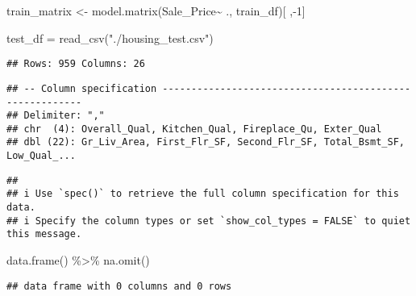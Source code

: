 \documentclass[
]{article}
\newenvironment{Shaded}{\begin{snugshade}}{\end{snugshade}}
\newcommand{\CommentTok}[1]{\textcolor[rgb]{0.56,0.35,0.01}{\textit{#1}}}
\newcommand{\DecValTok}[1]{\textcolor[rgb]{0.00,0.00,0.81}{#1}}
\newcommand{\FunctionTok}[1]{\textcolor[rgb]{0.00,0.00,0.00}{#1}}
\newcommand{\NormalTok}[1]{#1}
\newcommand{\OtherTok}[1]{\textcolor[rgb]{0.56,0.35,0.01}{#1}}
\newcommand{\SpecialCharTok}[1]{\textcolor[rgb]{0.00,0.00,0.00}{#1}}
\newcommand{\StringTok}[1]{\textcolor[rgb]{0.31,0.60,0.02}{#1}}
\begin{document}
\begin{Shaded}
\begin{Highlighting}[]
\NormalTok{train\_matrix }\OtherTok{\textless{}{-}} \FunctionTok{model.matrix}\NormalTok{(Sale\_Price}\SpecialCharTok{\textasciitilde{}}\NormalTok{ ., train\_df)[ ,}\SpecialCharTok{{-}}\DecValTok{1}\NormalTok{] }

\NormalTok{test\_df }\OtherTok{=} \FunctionTok{read\_csv}\NormalTok{(}\StringTok{"./housing\_test.csv"}\NormalTok{)}
\end{Highlighting}
\end{Shaded}

\begin{verbatim}
## Rows: 959 Columns: 26
\end{verbatim}

\begin{verbatim}
## -- Column specification --------------------------------------------------------
## Delimiter: ","
## chr  (4): Overall_Qual, Kitchen_Qual, Fireplace_Qu, Exter_Qual
## dbl (22): Gr_Liv_Area, First_Flr_SF, Second_Flr_SF, Total_Bsmt_SF, Low_Qual_...
\end{verbatim}

\begin{verbatim}
## 
## i Use `spec()` to retrieve the full column specification for this data.
## i Specify the column types or set `show_col_types = FALSE` to quiet this message.
\end{verbatim}

\begin{Shaded}
\begin{Highlighting}[]
  \FunctionTok{data.frame}\NormalTok{() }\SpecialCharTok{\%\textgreater{}\%} 
  \FunctionTok{na.omit}\NormalTok{()}
\end{Highlighting}
\end{Shaded}

\begin{verbatim}
## data frame with 0 columns and 0 rows
\end{verbatim}

\begin{Shaded}
\end{Shaded}
\end{document}

